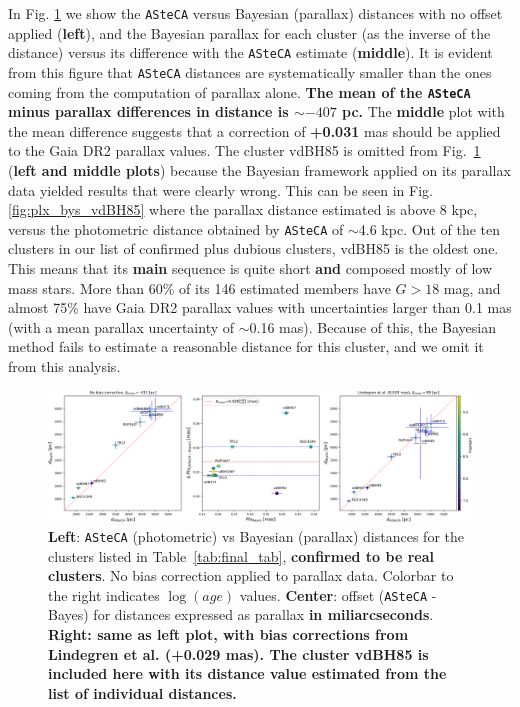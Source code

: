 \documentclass[referee]{aa}
\begin{document}
In Fig. \ref{fig:prlxbias} we show the \texttt{ASteCA} versus Bayesian 
(parallax) distances with no offset applied (\textbf{left}), and the Bayesian
parallax for each cluster (as the inverse of the distance) versus its
difference with the \texttt{ASteCA} estimate (\textbf{middle}).
%
It is evident from this figure that \texttt{ASteCA} distances are
systematically smaller than the ones coming from the computation of parallax
alone. \textbf{The mean of the \texttt{ASteCA} minus parallax differences in
distance is $\sim-407$ pc.}
The \textbf{middle} plot with the mean difference suggests that a correction of
\textbf{+0.031} mas should be applied to the Gaia DR2 parallax values.
%
The cluster vdBH85 is omitted from Fig.~\ref{fig:prlxbias} (\textbf{left and
middle plots}) because the Bayesian framework applied on its parallax data
yielded results that were clearly wrong. This can be seen in Fig. 
\ref{fig:plx_bys_vdBH85} where the parallax distance estimated is above 8 kpc,
versus the photometric distance obtained by \texttt{ASteCA} of $\sim$4.6 kpc.
Out of the ten clusters in our list of confirmed plus dubious clusters, vdBH85
is the oldest one. This means that its \textbf{main} sequence is quite
short \textbf{and} composed mostly of low mass stars.
More than 60\% of its 146 estimated members have $G>18$ mag, and almost
75\% have Gaia DR2 parallax values with uncertainties larger than 0.1 mas 
(with a mean parallax uncertainty of $\sim$0.16 mas). Because of this, the
Bayesian method fails to estimate a reasonable distance for this cluster,
and we omit it from this analysis.\\

\begin{figure}[ht]
    \centering
    \includegraphics[width=\hsize]{../figs/dist_comparision.png}
\caption{\textbf{Left}: \texttt{ASteCA} (photometric) vs Bayesian (parallax)
distances for the clusters listed in Table~\ref{tab:final_tab}, 
\textbf{confirmed to be real clusters}. No bias correction applied to parallax
data. Colorbar to the right indicates $\log(age)$ values.
\textbf{Center}: offset (\texttt{ASteCA} - Bayes) for distances expressed as
parallax \textbf{in miliarcseconds}.
\textbf{Right: same as left plot, with bias corrections from Lindegren et al.
\textbf{(+0.029 mas)}.
The cluster vdBH85 is included here with its distance value estimated from the
list of \cite{BailerJones_2018} individual distances.}
}
    \label{fig:prlxbias}
\end{figure}
\end{document}
